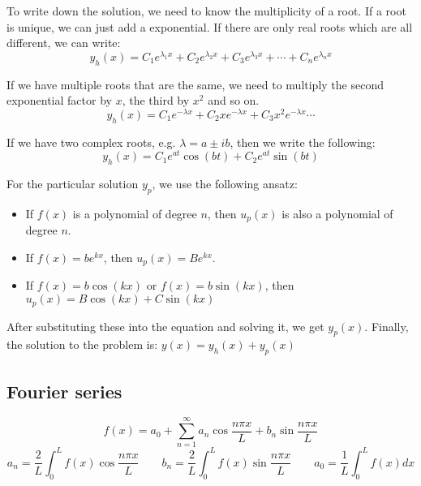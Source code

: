 \documentclass{article}
\begin{document}
\begin{twocolumn}
To write down the solution, we need to know the multiplicity of a root. If a root is unique, we can just add a exponential. If there are only real roots which are all different, we can write:
$$y_h(x) = C_1 e^{\lambda_1 x} + C_2 e^{\lambda_2 x} + C_3 e^{\lambda_3 x} + \cdots + C_n e^{\lambda_n x}$$

If we have multiple roots that are the same, we need to multiply the second exponential factor by $x$, the third by $x^2$ and so on. 
$$y_h(x) = C_1 e^{-\lambda x} + C_2 x e^{-\lambda x} + C_3 x^2 e^{-\lambda x} \cdots$$

If we have two complex roots, e.g. $\lambda = a \pm ib$, then we write the following:
$$y_h(x) = C_1 e^{a t} \cos(bt) + C_2 e^{a t} \sin(bt)$$ 

For the particular solution $y_p$, we use the following ansatz:
\begin{itemize}
	\item If $f(x)$ is a polynomial of degree $n$, then $u_p(x)$ is also a polynomial of degree $n$. 
	\item If $f(x) = b e^{k x}$, then $u_p(x) = B e^{k x}$. 
	\item If $f(x) = b \cos(k x)$ or $f(x) = b \sin(k x)$, then $u_p(x) = B \cos(k x) + C \sin (k x)$ 
\end{itemize}
After substituting these into the equation and solving it, we get $y_p(x)$. Finally, the solution to the problem is: $y(x) = y_h(x) + y_p(x)$


\subsection{Fourier series}

$$f(x) = a_0 + \sum_{n=1}^{\infty} a_n \cos \frac{n\pi x}{L} + b_n \sin \frac{n\pi x}{L} $$
$$a_n = \frac{2}{L} \int_{0}^{L} f(x) \cos \frac{n \pi x}{L} \qquad b_n = \frac{2}{L} \int_0^L f(x) \sin \frac{n \pi x}{L} \qquad a_0 = \frac{1}{L} \int_{0}^{L} f(x) dx$$


\end{twocolumn}
\end{document}
